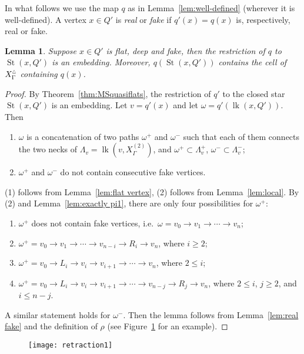 \documentclass[11pt]{amsart}
\newcommand{\lk}{\operatorname{lk}}
\newcommand{\St}{\operatorname{St}}
\newtheorem{lemma}[theorem]{Lemma}
\theoremstyle{definition}
\newcommand{\Xb}{X^{\scalebox{0.53}{$\triangle$}}}
\begin{document}
In what follows we use the map $q$ as in Lemma~\ref{lem:well-defined} (wherever it is well-defined).
A vertex $x\in Q'$ is \emph{real} or \emph{fake} if $q'(x)=q(x)$ is, respectively, real or fake. 

\begin{lemma}
	\label{lem:fake vertex}
Suppose $x\in Q'$ is flat, deep and fake, then the restriction of $q$ to $\St(x,Q')$ is an embedding. Moreover, $q(\St(x,Q'))$ contains the cell of $\Xb_\Gamma$ containing $q(x)$.
\end{lemma}

\begin{proof}
By Theorem~\ref{thm:MSquasiflats}, the restriction of $q'$ to the closed star $\St(x,Q')$ is an embedding. Let $v=q'(x)$ and let $\omega=q'(\lk(x,Q'))$. Then
\begin{enumerate}
	\item $\omega$ is a concatenation of two paths $\omega^+$ and $\omega^-$ such that each of them connects the two necks of $\Lambda_v=\lk(v,X^{(2)}_\Gamma)$, and $\omega^+\subset\Lambda^+_v$, $\omega^-\subset\Lambda^-_v$;
	\item $\omega^+$ and $\omega^-$ do not contain consecutive fake vertices.
\end{enumerate}
(1) follows from Lemma~\ref{lem:flat vertex}, (2) follows from Lemma~\ref{lem:local}. By (2) and Lemma~\ref{lem:exactly pi1}, there are only four possibilities for $\omega^+$:
\begin{enumerate}
		\item $\omega^+$ does not contain fake vertices, i.e.\ $\omega=v_0\to v_1\to\cdots\to v_n$;
		\item $\omega^+=v_0\to v_1\to\cdots\to v_{n-i}\to R_i\to v_n$, where $i\ge2$;
		\item $\omega^+=v_0\to L_i\to v_i\to v_{i+1}\to\cdots \to v_n$, where $2\le i$;
		\item $\omega^+=v_0\to L_i\to v_i\to v_{i+1}\to\cdots \to v_{n-j}\to R_j\to v_n$, where $2\le i$, $j\ge 2$, and $i\le n-j$.
\end{enumerate}
A similar statement holds for $\omega^-$. Then the lemma follows from Lemma~\ref{lem:real fake} and the definition of $\rho$ (see Figure~\ref{f:retraction} for an example).
\end{proof}

\begin{figure}[h!]
	\centering
	\texttt{[image: retraction1]}
	\caption{}
	\label{f:retraction}
\end{figure}
\end{document}
